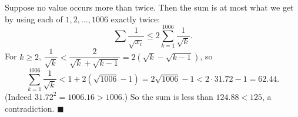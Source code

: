 Suppose no value occurs more than twice. Then the sum is at most what we get by using each of $1,2,\dots,1006$ exactly twice:
\[\sum\dfrac{1}{\sqrt{x_i}}\le2\sum_{k=1}^{1006}\dfrac{1}{\sqrt k}.\]
For $k\ge2$, $\dfrac{1}{\sqrt k}<\dfrac{2}{\sqrt k+\sqrt{k-1}}=2\left(\sqrt k-\sqrt{k-1}\right)$, so
\[\sum_{k=1}^{1006}\dfrac{1}{\sqrt k}<1+2\left(\sqrt{1006}-1\right)=2\sqrt{1006}-1<2\cdot31.72-1=62.44.\]
(Indeed $31.72^2=1006.16>1006$.) So the sum is less than $124.88<125$, a contradiction. $\blacksquare$
